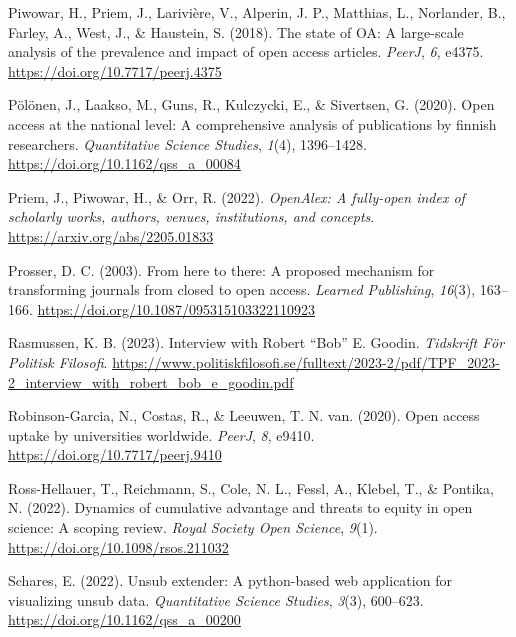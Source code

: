 \documentclass[a4paper,man,floatsintext,longtable,noextraspace,12pt]{apa6}
\newenvironment{CSLReferences}%
  {}%
  {\par}
\begin{document}
\begin{CSLReferences}{1}{0}
\leavevmode{}%
Piwowar, H., Priem, J., Larivière, V., Alperin, J. P., Matthias, L.,
Norlander, B., Farley, A., West, J., \& Haustein, S. (2018). The state
of {OA}: A large-scale analysis of the prevalence and impact of open
access articles. \emph{{PeerJ}}, \emph{6}, e4375.
\url{https://doi.org/10.7717/peerj.4375}

\leavevmode{}%
Pölönen, J., Laakso, M., Guns, R., Kulczycki, E., \& Sivertsen, G.
(2020). Open access at the national level: A comprehensive analysis of
publications by finnish researchers. \emph{Quantitative Science
Studies}, \emph{1}(4), 1396--1428.
\url{https://doi.org/10.1162/qss_a_00084}

\leavevmode{}%
Priem, J., Piwowar, H., \& Orr, R. (2022). \emph{OpenAlex: A fully-open
index of scholarly works, authors, venues, institutions, and concepts}.
\url{https://arxiv.org/abs/2205.01833}

\leavevmode{}%
Prosser, D. C. (2003). From here to there: A proposed mechanism for
transforming journals from closed to open access. \emph{Learned
Publishing}, \emph{16}(3), 163--166.
\url{https://doi.org/10.1087/095315103322110923}

\leavevmode{}%
Rasmussen, K. B. (2023). Interview with {Robert {``Bob''} E. Goodin}.
\emph{Tidskrift För Politisk Filosofi}.
\url{https://www.politiskfilosofi.se/fulltext/2023-2/pdf/TPF_2023-2_interview_with_robert_bob_e_goodin.pdf}

\leavevmode{}%
Robinson-Garcia, N., Costas, R., \& Leeuwen, T. N. van. (2020). Open
access uptake by universities worldwide. \emph{{PeerJ}}, \emph{8},
e9410. \url{https://doi.org/10.7717/peerj.9410}

\leavevmode{}%
Ross-Hellauer, T., Reichmann, S., Cole, N. L., Fessl, A., Klebel, T., \&
Pontika, N. (2022). Dynamics of cumulative advantage and threats to
equity in open science: A scoping review. \emph{Royal Society Open
Science}, \emph{9}(1). \url{https://doi.org/10.1098/rsos.211032}

\leavevmode{}%
Schares, E. (2022). Unsub extender: A python-based web application for
visualizing unsub data. \emph{Quantitative Science Studies},
\emph{3}(3), 600--623. \url{https://doi.org/10.1162/qss_a_00200}


\end{CSLReferences}
\end{document}
